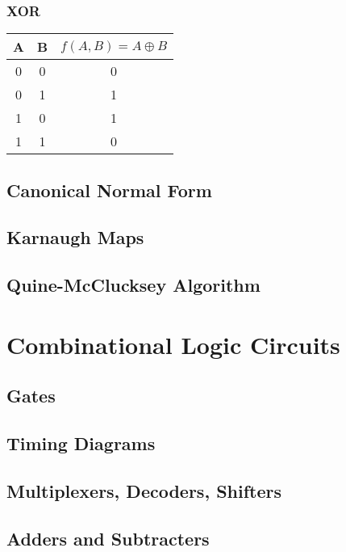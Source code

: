 \documentclass[11pt]{article}
\begin{document}
\subsubsection{XOR}

\begin{table}[H]
	\centering
	\begin{tabular}{c c | c}
		A	&	B	&	\( f(A,B) = A \oplus B \)\\
		\hline
		0	&	0	&	0\\
		0	&	1	&	1\\
		1	&	0	&	1\\
		1	&	1	&	0
	\end{tabular}
\end{table}

\subsection{Canonical Normal Form}

\subsection{Karnaugh Maps}

\subsection{Quine-McClucksey Algorithm}

\section{Combinational Logic Circuits}

\subsection{Gates}

\subsection{Timing Diagrams}

\subsection{Multiplexers, Decoders, Shifters}

\subsection{Adders and Subtracters}
\end{document}
